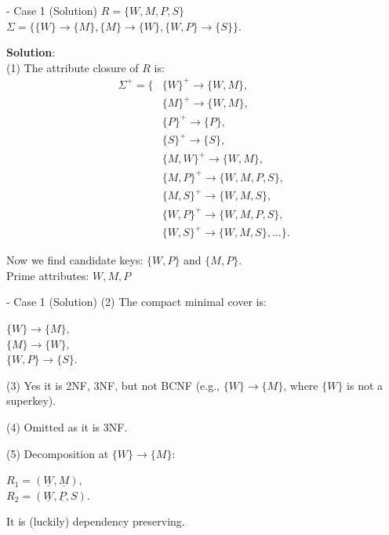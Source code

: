 \begin{frame}[fragile]{ - Case 1 (Solution)}
	$R = \{W, M, P, S\}$\\
	$\Sigma = \{\{W\} \rightarrow \{M\}, \{M\} \rightarrow \{W\},
	\{W, P\} \rightarrow \{S\}\}$.\\\vspace{5pt}
	
	\textbf{Solution}:\\
	(1) The attribute closure of $R$ is:
	\begin{align*} 
		\Sigma^{+} = \{&\{W\}^{+} \rightarrow \{W, M\},\\
		&\{M\}^{+} \rightarrow \{W, M\},\\
		&\{P\}^{+} \rightarrow \{P\},\\
		&\{S\}^{+} \rightarrow \{S\},\\
		&\{{M,W}\}^{+} \rightarrow \{W, M\},\\
		&\{{M,P}\}^{+} \rightarrow \{W, M, P, S\},\\
		&\{{M,S}\}^{+} \rightarrow \{W, M, S\},\\
		&\{{W,P}\}^{+} \rightarrow \{W, M, P, S\},\\
		&\{{W,S}\}^{+} \rightarrow \{W, M, S\},...\}.
	\end{align*} 
	
	Now we find candidate keys: $\{W, P\}$ and $\{M, P\}$.\\
	Prime attributes: $W, M, P$
\end{frame}

\begin{frame}[fragile]{ - Case 1 (Solution)}
	(2) The compact minimal cover is:\\\vspace{5pt}
	
	$\{W\} \rightarrow \{M\},$\\
	$\{M\}  \rightarrow \{W\},$\\
	$\{W, P\} \rightarrow \{S\}.$\\\vspace{5pt}
	
	(3)  Yes it is 2NF, 3NF, but not BCNF (e.g., $\{W\} \rightarrow \{M\}$, where $\{W\}$ is not a superkey).\\\vspace{5pt}
	
	(4) Omitted as it is 3NF. \\\vspace{5pt}
	
	(5) Decomposition at $\{W\} \rightarrow \{M\}$:\\\vspace{5pt}
	
	$R_1 = (\underline{W}, \underline{M}),$\\
	$R_2 = (\underline{W}, \underline{P}, S).$\\\vspace{5pt}
	
	It is (luckily) dependency preserving.
	
\end{frame}

